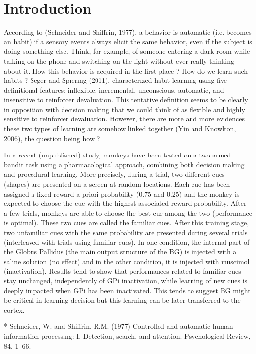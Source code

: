\section{Introduction}

According to (Schneider and Shiffrin, 1977), a behavior is automatic
(i.e. becomes an habit) if a sensory events always elicit the same behavior,
even if the subject is doing something else. Think, for example, of someone
entering a dark room while talking on the phone and switching on the light
without ever really thinking about it. How this behavior is acquired in the
first place ? How do we learn such habits ? Seger and Spiering (2011),
characterized habit learning using five definitional features: inflexible,
incremental, unconscious, automatic, and insensitive to reinforcer
devaluation. This tentative definition seems to be clearly in opposition with
decision making that we could think of as flexible and highly sensitive to
reinforcer devaluation. However, there are more and more evidences these two
types of learning are somehow linked together (Yin and Knowlton, 2006), the
question being how ?

In a recent (unpublished) study, monkeys have been tested on a two-armed bandit
task using a pharmacological approach, combining both decision making and
procedural learning. More precisely, during a trial, two different cues
(shapes) are presented on a screen at random locations. Each cue has been
assigned a fixed reward a priori probability (0.75 and 0.25) and the monkey is
expected to choose the cue with the highest associated reward probability.
After a few trials, monkeys are able to choose the best cue among the two
(performance is optimal). These two cues are called the familiar cues. After
this training stage, two unfamiliar cues with the same probability are
presented during several trials (interleaved with trials using familiar
cues). In one condition, the internal part of the Globus Pallidus (the main
output structure of the BG) is injected with a saline solution (no effect) and
in the other condition, it is injected with muscimol (inactivation). Results
tend to show that performances related to familiar cues stay unchanged,
independently of GPi inactivation, while learning of new cues is deeply
impacted when GPi has been inactivated. This tends to suggest BG might be
critical in learning decision but this learning can be later transferred to the
cortex.


* Schneider, W. and Shiffrin, R.M. (1977) Controlled and automatic human
  information processing: I. Detection, search, and attention. Psychological
  Review, 84, 1–66.

